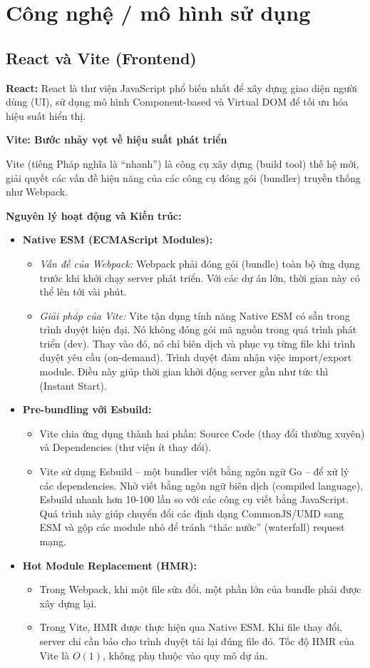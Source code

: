 \documentclass[12pt,a4paper]{report}
\begin{document}
\section{Công nghệ / mô hình sử dụng}

\subsection{React và Vite (Frontend)}
\textbf{React:} React là thư viện JavaScript phổ biến nhất để xây dựng giao diện người dùng (UI), sử dụng mô hình Component-based và Virtual DOM để tối ưu hóa hiệu suất hiển thị.

\textbf{Vite: Bước nhảy vọt về hiệu suất phát triển}

Vite (tiếng Pháp nghĩa là ``nhanh'') là công cụ xây dựng (build tool) thế hệ mới, giải quyết các vấn đề hiệu năng của các công cụ đóng gói (bundler) truyền thống như Webpack.

\textbf{Nguyên lý hoạt động và Kiến trúc:}
\begin{itemize}
    \item \textbf{Native ESM (ECMAScript Modules):}
    \begin{itemize}
        \item \textit{Vấn đề của Webpack:} Webpack phải đóng gói (bundle) toàn bộ ứng dụng trước khi khởi chạy server phát triển. Với các dự án lớn, thời gian này có thể lên tới vài phút.
        \item \textit{Giải pháp của Vite:} Vite tận dụng tính năng Native ESM có sẵn trong trình duyệt hiện đại. Nó không đóng gói mã nguồn trong quá trình phát triển (dev). Thay vào đó, nó chỉ biên dịch và phục vụ từng file khi trình duyệt yêu cầu (on-demand). Trình duyệt đảm nhận việc import/export module. Điều này giúp thời gian khởi động server gần như tức thì (Instant Start).
    \end{itemize}
    \item \textbf{Pre-bundling với Esbuild:}
    \begin{itemize}
        \item Vite chia ứng dụng thành hai phần: Source Code (thay đổi thường xuyên) và Dependencies (thư viện ít thay đổi).
        \item Vite sử dụng Esbuild – một bundler viết bằng ngôn ngữ Go – để xử lý các dependencies. Nhờ viết bằng ngôn ngữ biên dịch (compiled language), Esbuild nhanh hơn 10-100 lần so với các công cụ viết bằng JavaScript. Quá trình này giúp chuyển đổi các định dạng CommonJS/UMD sang ESM và gộp các module nhỏ để tránh ``thác nước'' (waterfall) request mạng.
    \end{itemize}
    \item \textbf{Hot Module Replacement (HMR):}
    \begin{itemize}
        \item Trong Webpack, khi một file sửa đổi, một phần lớn của bundle phải được xây dựng lại.
        \item Trong Vite, HMR được thực hiện qua Native ESM. Khi file thay đổi, server chỉ cần báo cho trình duyệt tải lại đúng file đó. Tốc độ HMR của Vite là $O(1)$, không phụ thuộc vào quy mô dự án.
    \end{itemize}
\end{itemize}
\end{document}
